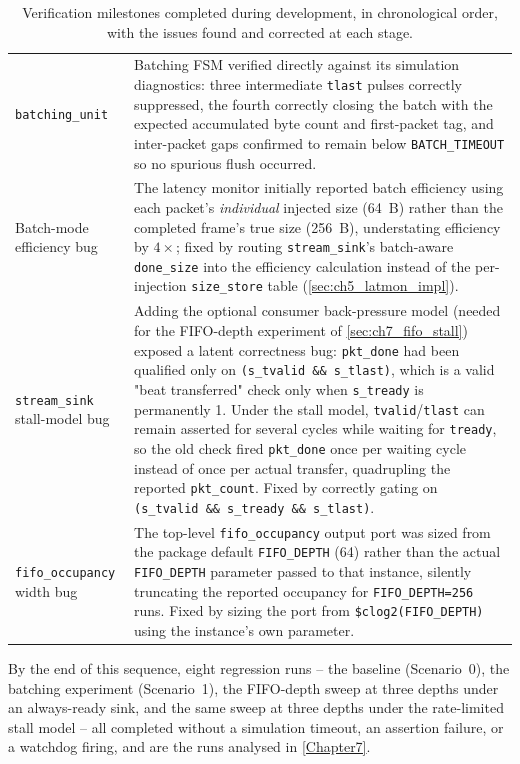 \begin{table}[htbp]
\begin{tabular}{@{}p{2.6cm}p{9.7cm}@{}}
\texttt{batching\_unit} & Batching FSM verified directly against its simulation diagnostics: three intermediate \texttt{tlast} pulses correctly suppressed, the fourth correctly closing the batch with the expected accumulated byte count and first-packet tag, and inter-packet gaps confirmed to remain below \texttt{BATCH\_TIMEOUT} so no spurious flush occurred. \\
Batch-mode efficiency bug & The latency monitor initially reported batch efficiency using each packet's \emph{individual} injected size (64~B) rather than the completed frame's true size (256~B), understating efficiency by $4\times$; fixed by routing \texttt{stream\_sink}'s batch-aware \texttt{done\_size} into the efficiency calculation instead of the per-injection \texttt{size\_store} table (\autoref{sec:ch5_latmon_impl}). \\
\texttt{stream\_sink} stall-model bug & Adding the optional consumer back-pressure model (needed for the FIFO-depth experiment of \autoref{sec:ch7_fifo_stall}) exposed a latent correctness bug: \texttt{pkt\_done} had been qualified only on \texttt{(s\_tvalid \&\& s\_tlast)}, which is a valid "beat transferred" check only when \texttt{s\_tready} is permanently 1. Under the stall model, \texttt{tvalid}/\texttt{tlast} can remain asserted for several cycles while waiting for \texttt{tready}, so the old check fired \texttt{pkt\_done} once per waiting cycle instead of once per actual transfer, quadrupling the reported \texttt{pkt\_count}. Fixed by correctly gating on \texttt{(s\_tvalid \&\& s\_tready \&\& s\_tlast)}. \\
\texttt{fifo\_occupancy} width bug & The top-level \texttt{fifo\_occupancy} output port was sized from the package default \texttt{FIFO\_DEPTH} (64) rather than the actual \texttt{FIFO\_DEPTH} parameter passed to that instance, silently truncating the reported occupancy for \texttt{FIFO\_DEPTH=256} runs. Fixed by sizing the port from \texttt{\$clog2(FIFO\_DEPTH)} using the instance's own parameter. \\
\bottomrule
\end{tabular}
\caption{Verification milestones completed during development, in chronological order, with the issues found and corrected at each stage.}
\label{tab:milestones}
\end{table}

By the end of this sequence, eight regression runs -- the baseline (Scenario~0), the batching experiment (Scenario~1), the FIFO-depth sweep at three depths under an always-ready sink, and the same sweep at three depths under the rate-limited stall model -- all completed without a simulation timeout, an assertion failure, or a watchdog firing, and are the runs analysed in \autoref{Chapter7}.
